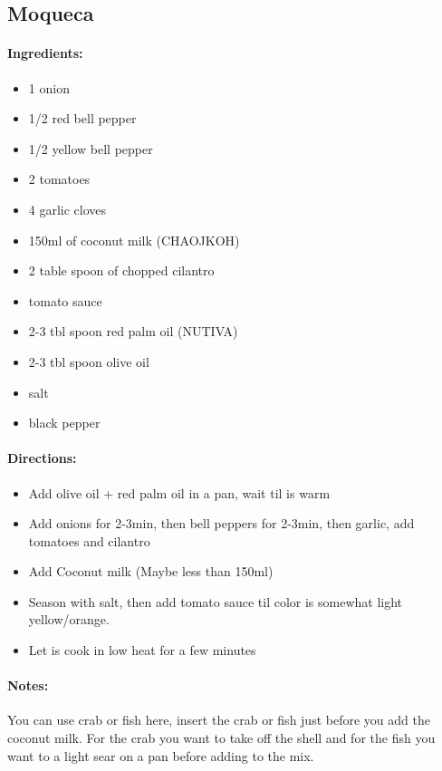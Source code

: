 \documentclass{article}
\begin{document}
\subsection{Moqueca}

\paragraph{Ingredients:}

\begin{itemize}
	\item 1 onion	
	\item 1/2 red bell pepper 
	\item 1/2 yellow bell pepper 
	\item 2 tomatoes
	\item 4 garlic cloves
	\item 150ml of coconut milk (CHAOJKOH)
	\item 2 table spoon of chopped cilantro
	\item tomato sauce
	\item 2-3 tbl spoon red palm oil (NUTIVA)
	\item 2-3 tbl spoon olive oil
	\item salt
	\item black pepper
\end{itemize}

\paragraph{Directions:}
\begin{itemize}
	\item Add olive oil + red palm oil in a pan, wait til is warm
	\item Add onions for 2-3min, then bell peppers for 2-3min, then garlic, add tomatoes and cilantro
	\item Add Coconut milk (Maybe less than 150ml)
	\item Season with salt, then add tomato sauce til color is somewhat light yellow/orange.
	\item Let is cook in low heat for a few minutes
\end{itemize}

\paragraph{Notes:} You can use crab or fish here, insert the crab or fish just before you add the coconut milk. For the crab you want to take off the shell and for the fish you want to a light sear on a pan before adding to the mix.
\end{document}
